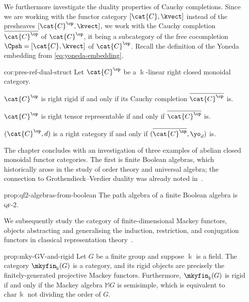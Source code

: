 We furthermore investigate the duality properties of Cauchy completions.
Since we are working with the functor category
\([\cat{C}, \kvect]\) instead of the presheaves \([\cat{C}^{\op}, \kvect]\),
we work with the Cauchy completion \(\overline{\cat{C}^{\op}}\) of \(\cat{C}^{\op}\),
it being a subcategory of the free cocompletion \(\Cpsh = [\cat{C}, \kvect]\) of \(\cat{C}^{\op}\).
Recall the definition of the Yoneda embedding from \cref{eq:yoneda-embedding}.

\begin{reptheorem}{cor:pres-ref-dual-struct}
  Let \(\cat{C}^{\op}\) be a \(\Bbbk\)\hyp{}linear right closed monoidal category.
  \begin{thmlist}[noitemsep]
    \item \(\cat{C}^{\op}\) is right rigid if and only if its Cauchy completion \(\overline{\cat{C}^{\op}}\) is.
    \item \(\cat{C}^{\op}\) is right tensor representable if and only if \(\overline{\cat{C}^{\op}}\) is.
    \item \((\cat{C}^{\op}, d)\) is a right \GV{} category if and only if \((\overline{\cat{C}^{\op}}, \yo_{d})\) is.
  \end{thmlist}
\end{reptheorem}

The chapter concludes with an investigation of three examples of abelian closed monoidal functor categories.
The first is finite Boolean algebras,
which historically arose in the study of order theory and universal algebra;
the connection to Grothendieck–Verdier duality was already noted in~\cite{barr79}.

\begin{reptheorem}{prop:qf2-algebras-from-boolean}
  The path algebra of a finite Boolean algebra is \textsc{qf}-2.%
\end{reptheorem}

We subsequently study the category of finite-dimensional Mackey functors,
objects abstracting and generalising the induction, restriction, and conjugation functors
in classical representation theory~\cite{lindner76:mackey,thevenaz95:mackey,webb00:mackey}.

\begin{reptheorem}{prop:mky-GV-and-rigid}
  Let \(G\) be a finite group and suppose \(\Bbbk\) is a field.
  The category \(\mkyfin_\Bbbk(G)\) is a \GV{} category,
  and its rigid objects are precisely the finitely\hyp{}generated projective Mackey functors.
  Furthermore, \(\mkyfin_{\Bbbk}(G)\) is rigid
  if and only if the Mackey algebra \(\mathbb{M}G\) is semisimple,
  which is equivalent to \(\mathrm{char}\,\Bbbk\) not dividing the order of \(G\).
\end{reptheorem}

